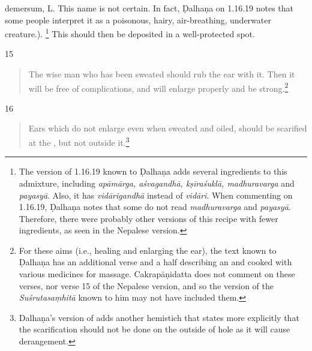 \begin{translation}
{        demersum, L. 
        This name is not
    certain. In fact, Ḍalhaṇa on 1.16.19 \citep[79]{vulgate} notes that some people interpret it as a poisonous, hairy, air-breathing, underwater creature.}).%
    \footnote{The version of 1.16.19 known to Ḍalhaṇa \citep[79]{vulgate} adds several 
    ingredients to this admixture, including \emph{apāmārga, aśvagandhā, 
    kṣīraśuklā, madhuravarga} and \emph{payasyā}. Also, it has 
    \emph{vidārigandhā} instead of \emph{vidāri}. When commenting on 1.16.19, 
    Ḍalhaṇa \citep[79]{vulgate} notes that some do not read 
    \emph{madhuravarga} and \emph{payasyā}. Therefore, there were probably 
    other versions of this recipe with fewer ingredients, as seen in the Nepalese 
    version.}
    This should then be deposited in a well-protected spot.
    
    \item[15]%
    \begin{verse}
        
        The wise man who has been sweated should rub the  ear with 
        it. 
        Then it will be free of complications, and will enlarge properly and be strong.\footnote{For these aims (i.e., healing and enlarging the ear), the text known to Ḍalhaṇa \citep[79]{vulgate} has an additional verse and a half describing an  and  cooked with various medicines for massage. Cakrapāṇidatta \citep[131]{acar-1939} does not comment on these verses, nor verse 15 of the Nepalese version, and so the version of the \emph{Suśrutasaṃhitā} known to him may not have included them.}
    \end{verse}
    
    \item[16]
        \begin{verse}
    Ears which do not enlarge even when sweated and oiled, 
    should be scarified  at the , but not outside 
    it.\footnote{Dalhaṇa's version of 
     adds another hemistich that states more explicitly that the 
    scarification should not be done on the outside of hole as it will cause derangement.}  
        \end{verse}
    

\end{translation}
